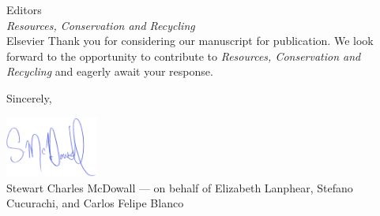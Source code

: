 \documentclass[10pt]{letter}
\begin{document}
\begin{letter}{Editors\\\textit{Resources, Conservation and Recycling}\\Elsevier}
    Thank you for considering our manuscript for publication. We look forward to the opportunity to contribute to \textit{Resources, Conservation and Recycling} and eagerly await your response.

    \vspace{0.5em}

    \closing{Sincerely,}
    \begin{minipage}[t]{0.9\textwidth}
        \vspace{-2cm}
        \hspace{0.1cm}
        \includegraphics[height=2cm]{signature_scm.png}\\ %
        Stewart Charles McDowall   ---   on behalf of Elizabeth Lanphear, Stefano Cucurachi, and Carlos Felipe Blanco\\
    \end{minipage}%




\end{letter}
\end{document}
